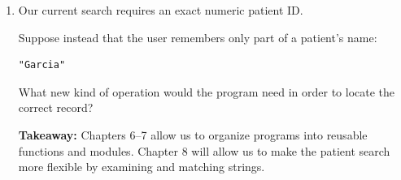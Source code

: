 \documentclass{article}
\begin{document}
\begin{enumerate}

\item Our current search requires an exact numeric patient ID.

Suppose instead that the user remembers only part of a patient's
name:

\begin{verbatim}
"Garcia"
\end{verbatim}

What new kind of operation would the program need in order to
locate the correct record?

\vspace{0.25cm}

\textbf{Takeaway:} Chapters 6--7 allow us to organize programs into
reusable functions and modules. Chapter 8 will allow us to make
the patient search more flexible by examining and matching strings.

\end{enumerate}
\end{document}
